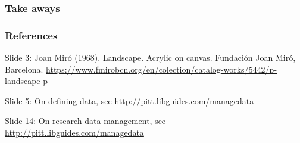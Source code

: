 \documentclass{beamer}
\begin{document}
\begin{frame}
  \frametitle{Take aways}
  
\end{frame}

\begin{frame}
  \frametitle{References}
  \tiny
  
  \vspace{0.5cm}
  Slide 3: Joan Mir{\'o} (1968). Landscape. Acrylic on canvas. Fundaci{\'o}n Joan Mir{\'o}, Barcelona. \url{https://www.fmirobcn.org/en/colection/catalog-works/5442/p-landscape-p}
  
  Slide 5: On defining data, see \url{http://pitt.libguides.com/managedata}
  
  Slide 14: On research data management, see \url{http://pitt.libguides.com/managedata}
\end{frame}
\end{document}
